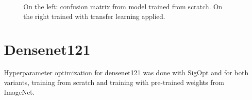 \begin{figure}[h]
\centering
{}
\caption{On the left: confusion matrix from model trained from scratch. On the right trained with transfer learning applied.}
\label{fig:resnet18-cm}
\end{figure}




















\section{Densenet121}

Hyperparameter optimization for densenet121 was done with SigOpt and for both variants, training from scratch and training with pre-trained weights from ImageNet.

